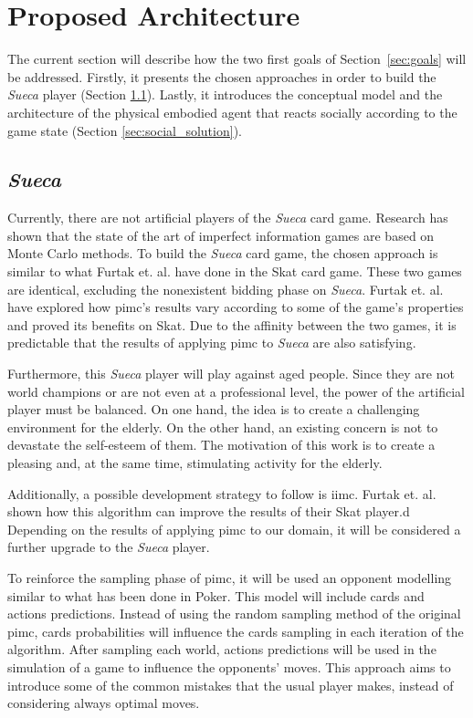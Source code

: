 \section{Proposed Architecture} \label{architecture}

The current section will describe how the two first goals of
Section~\ref{sec:goals} will be addressed.
Firstly, it presents the chosen approaches in order to build the \emph{Sueca} player (Section \ref{sec:sueca_solution}).
Lastly, it introduces the conceptual model and the architecture of the physical embodied agent that reacts socially according to the game state (Section \ref{sec:social_solution}).


\subsection{\emph{Sueca}}
\label{sec:sueca_solution}

Currently, there are not artificial players of the \emph{Sueca} card game.
Research has shown that the state of the art of imperfect information games are based on Monte Carlo methods.
To build the \emph{Sueca} card game, the chosen approach is similar to what Furtak et. al. have done in the Skat card game.
These two games are identical, excluding the nonexistent bidding phase on \emph{Sueca}.
Furtak et. al. have explored how \gls{pimc}'s results vary according to some of the game's properties and proved its benefits on Skat.
Due to the affinity between the two games, it is predictable that the results of applying \gls{pimc} to \emph{Sueca} are also satisfying.

Furthermore, this \emph{Sueca} player will play against aged people.
Since they are not world champions or are not even at a professional level, the power of the artificial player must be balanced.
On one hand, the idea is to create a challenging environment for the elderly.
On the other hand, an existing concern is not to devastate the self-esteem of them.
The motivation of this work is to create a pleasing and, at the same time, stimulating activity for the elderly.

Additionally, a possible development strategy to follow is \gls{iimc}.
Furtak et. al. shown how this algorithm can improve the results of their Skat player.d
Depending on the results of applying \gls{pimc} to our domain, it will be considered a further upgrade to the \emph{Sueca} player.

To reinforce the sampling phase of \gls{pimc}, it will be used an opponent modelling similar to what has been done in Poker.
This model will include cards and actions predictions.
Instead of using the random sampling method of the original \gls{pimc}, cards probabilities will influence the cards sampling in each iteration of the algorithm.
After sampling each world, actions predictions will be used in the simulation of a game to influence the opponents' moves.
This approach aims to introduce some of the common mistakes that the usual player makes, instead of considering always optimal moves.


